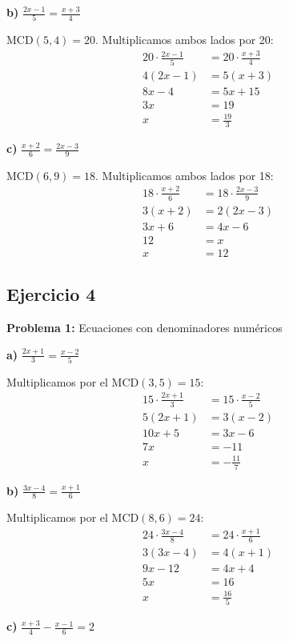 \textbf{b)} $\frac{2x-1}{5} = \frac{x+3}{4}$

MCD$(5,4) = 20$. Multiplicamos ambos lados por 20:
\begin{align}
20 \cdot \frac{2x-1}{5} &= 20 \cdot \frac{x+3}{4}\\
4(2x-1) &= 5(x+3)\\
8x - 4 &= 5x + 15\\
3x &= 19\\
x &= \frac{19}{3}
\end{align}

\textbf{c)} $\frac{x+2}{6} = \frac{2x-3}{9}$

MCD$(6,9) = 18$. Multiplicamos ambos lados por 18:
\begin{align}
18 \cdot \frac{x+2}{6} &= 18 \cdot \frac{2x-3}{9}\\
3(x+2) &= 2(2x-3)\\
3x + 6 &= 4x - 6\\
12 &= x\\
x &= 12
\end{align}

\subsection*{Ejercicio 4}

\textbf{Problema 1:} Ecuaciones con denominadores numéricos

\textbf{a)} $\frac{2x+1}{3} = \frac{x-2}{5}$

Multiplicamos por el MCD$(3,5) = 15$:
\begin{align}
15 \cdot \frac{2x+1}{3} &= 15 \cdot \frac{x-2}{5}\\
5(2x+1) &= 3(x-2)\\
10x + 5 &= 3x - 6\\
7x &= -11\\
x &= -\frac{11}{7}
\end{align}

\textbf{b)} $\frac{3x-4}{8} = \frac{x+1}{6}$

Multiplicamos por el MCD$(8,6) = 24$:
\begin{align}
24 \cdot \frac{3x-4}{8} &= 24 \cdot \frac{x+1}{6}\\
3(3x-4) &= 4(x+1)\\
9x - 12 &= 4x + 4\\
5x &= 16\\
x &= \frac{16}{5}
\end{align}

\textbf{c)} $\frac{x+3}{4} - \frac{x-1}{6} = 2$


